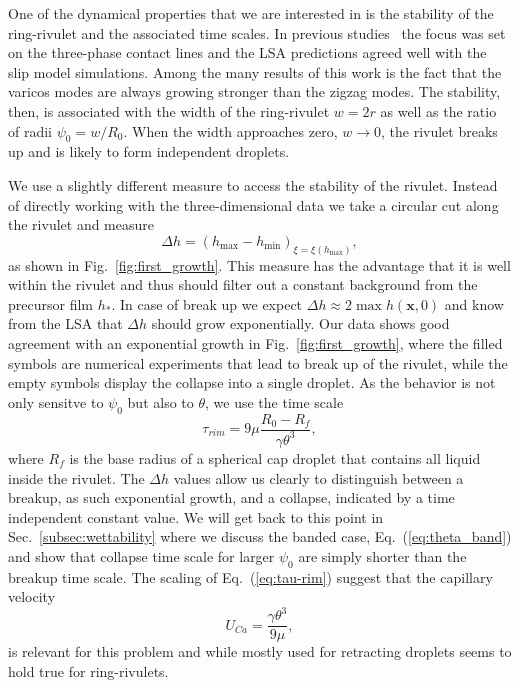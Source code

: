\documentclass[twoside,twocolumn,9pt]{article}
\begin{document}
One of the dynamical properties that we are interested in is the stability of the ring-rivulet and the associated time scales.
In previous studies~\cite{gonzalezStabilityLiquidRing2013} the focus was set on the three-phase contact lines and the LSA predictions agreed well with the slip model simulations.
Among the many results of this work is the fact that the varicos modes are always growing stronger than the zigzag modes.
The stability, then, is associated with the width of the ring-rivulet $w = 2r$ as well as the ratio of radii $\psi_0 = w/R_0$.
When the width approaches zero, $w \rightarrow 0$, the rivulet breaks up and is likely to form independent droplets.

We use a slightly different measure to access the stability of the rivulet. 
Instead of directly working with the three-dimensional data we take a circular cut along the rivulet and measure
\begin{equation}\label{eq:delta-h-measure}
    \Delta h = (h_{\max} - h_{\min})_{\xi = \xi(h_{\max})},
\end{equation}
as shown in Fig.~\ref{fig:first_growth}.
This measure has the advantage that it is well within the rivulet and thus should filter out a constant background from the precursor film $h_{\ast}$.
In case of break up we expect $\Delta h \approx 2\max{h(\mathbf{x},0)}$ and know from the LSA that $\Delta h$ should grow exponentially.
Our data shows good agreement with an exponential growth in Fig.~\ref{fig:first_growth}, where the filled symbols are numerical experiments that lead to break up of the rivulet, while the empty symbols display the collapse into a single droplet.
As the behavior is not only sensitve to $\psi_0$ but also to $\theta$, we use the time scale~\cite{edwardsNotSpreadingReverse2016}
\begin{equation}\label{eq:tau-rim}
    \tau_{rim} = 9\mu\frac{R_0 - R_f}{\gamma \theta^3},      
\end{equation}
where $R_f$ is the base radius of a spherical cap droplet that contains all liquid inside the rivulet.
The $\Delta h$ values allow us clearly to distinguish between a breakup, as such exponential growth, and a collapse, indicated by a time independent constant value.
We will get back to this point in Sec.~\ref{subsec:wettability} where we discuss the banded case, Eq.~(\ref{eq:theta_band}) and show that collapse time scale for larger $\psi_0$ are simply shorter than the breakup time scale.
The scaling of Eq.~(\ref{eq:tau-rim}) suggest that the capillary velocity 
\begin{equation}
    U_{Ca} = \frac{\gamma\theta^3}{9\mu},
\end{equation}
is relevant for this problem and while mostly used for retracting droplets seems to hold true for ring-rivulets.
\end{document}
